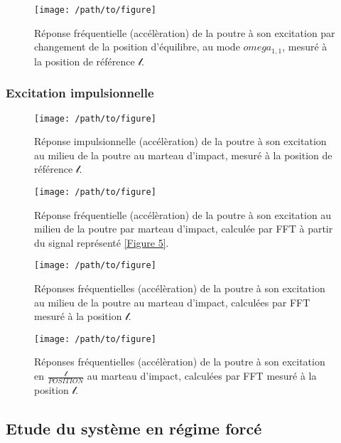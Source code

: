 \documentclass[10pt,a4paper, french]{article}
\begin{document}
\begin{figure}
  \texttt{[image: /path/to/figure]}
  \caption{Réponse fréquentielle (accélèration) de la poutre à son excitation par changement de la position d'équilibre, au mode $omega_{1,1}$, mesuré à la position de référence $\mathcal{l}$.}
  \label{Figure 4}
\end{figure}

\subsubsection{Excitation impulsionnelle}
\begin{figure}
  \texttt{[image: /path/to/figure]}
  \caption{Réponse impulsionnelle (accélèration) de la poutre à son excitation au milieu de la poutre au marteau d'impact, mesuré à la position de référence $\mathcal{l}$.}
  \label{Figure 5}
\end{figure}

\begin{figure}
  \texttt{[image: /path/to/figure]}
  \caption{Réponse fréquentielle (accélèration) de la poutre à son excitation au milieu de la poutre par marteau d'impact, calculée par FFT à partir du signal représenté \vref{Figure 5}.}
  \label{Figure 6}
\end{figure}

\begin{figure}
  \texttt{[image: /path/to/figure]}
  \caption{Réponses fréquentielles (accélèration) de la poutre à son excitation au milieu de la poutre au marteau d'impact, calculées par FFT mesuré à la position $\mathcal{l}$.}
\end{figure}
\begin{figure}
  \texttt{[image: /path/to/figure]}
  \caption{Réponses fréquentielles (accélèration) de la poutre à son excitation en $\frac{\mathcal{l}}{POSITION}$ au marteau d'impact, calculées par FFT mesuré à la position $\mathcal{l}$.}
\end{figure}



\subsection{Etude du système en régime forcé}
\end{document}
